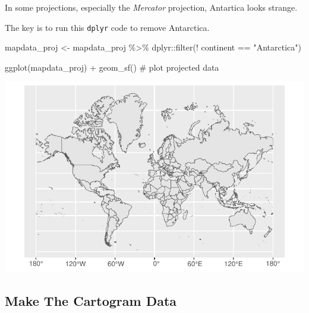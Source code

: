 \documentclass[
  letterpaper,
  DIV=11,
  numbers=noendperiod,
  oneside]{scrreprt}
\newenvironment{Shaded}{\begin{snugshade}}{\end{snugshade}}
\newcommand{\CommentTok}[1]{\textcolor[rgb]{0.37,0.37,0.37}{#1}}
\newcommand{\FunctionTok}[1]{\textcolor[rgb]{0.28,0.35,0.67}{#1}}
\newcommand{\NormalTok}[1]{\textcolor[rgb]{0.00,0.23,0.31}{#1}}
\newcommand{\OtherTok}[1]{\textcolor[rgb]{0.00,0.23,0.31}{#1}}
\newcommand{\SpecialCharTok}[1]{\textcolor[rgb]{0.37,0.37,0.37}{#1}}
\newcommand{\StringTok}[1]{\textcolor[rgb]{0.13,0.47,0.30}{#1}}
\begin{document}
\begin{tcolorbox}[enhanced jigsaw, opacityback=0, colback=white, toprule=.15mm, colframe=quarto-callout-tip-color-frame, bottomrule=.15mm, title=\textcolor{quarto-callout-tip-color}{\faLightbulb}\hspace{0.5em}{Why Does Antarctica Look So Strange? How To Fix This?}, coltitle=black, toptitle=1mm, bottomtitle=1mm, arc=.35mm, breakable, colbacktitle=quarto-callout-tip-color!10!white, left=2mm, rightrule=.15mm, titlerule=0mm, leftrule=.75mm, opacitybacktitle=0.6]

In some projections, especially the \emph{Mercator} projection,
Antartica looks strange.

The key is to run this \texttt{dplyr} code to remove Antarctica.

\begin{Shaded}
\begin{Highlighting}[]
\NormalTok{mapdata\_proj }\OtherTok{\textless{}{-}}\NormalTok{ mapdata\_proj }\SpecialCharTok{\%\textgreater{}\%} 
\NormalTok{  dplyr}\SpecialCharTok{::}\FunctionTok{filter}\NormalTok{(}\SpecialCharTok{!}\NormalTok{ continent }\SpecialCharTok{==} \StringTok{"Antarctica"}\NormalTok{)}

\FunctionTok{ggplot}\NormalTok{(mapdata\_proj) }\SpecialCharTok{+} 
  \FunctionTok{geom\_sf}\NormalTok{() }\CommentTok{\# plot projected data}
\end{Highlighting}
\end{Shaded}

\includegraphics{cartogram_files/figure-pdf/unnamed-chunk-7-1.pdf}

\end{tcolorbox}

\subsection{Make The Cartogram Data}\label{make-the-cartogram-data}
\end{document}

